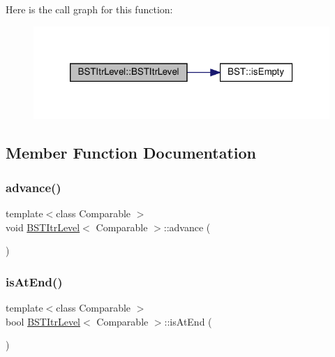 Here is the call graph for this function\+:\nopagebreak
\begin{figure}[H]
\begin{center}
\leavevmode
\includegraphics[width=320pt]{classBSTItrLevel_a8fd5cdde93eb182c4cd5cf6b2c5efaeb_cgraph}
\end{center}
\end{figure}


\subsection{Member Function Documentation}
\mbox{\label{classBSTItrLevel_ad54a6fa289a59d6050b507abe40d463b}} 
\subsubsection{\texorpdfstring{advance()}{advance()}}
{\footnotesize\ttfamily template$<$class Comparable $>$ \\
void \hyperlink{classBSTItrLevel}{B\+S\+T\+Itr\+Level}$<$ Comparable $>$\+::advance (\begin{DoxyParamCaption}{ }\end{DoxyParamCaption})}

\mbox{\label{classBSTItrLevel_a89bc8e81dde255fd6bad917cacc0d489}} 
\subsubsection{\texorpdfstring{is\+At\+End()}{isAtEnd()}}
{\footnotesize\ttfamily template$<$class Comparable $>$ \\
bool \hyperlink{classBSTItrLevel}{B\+S\+T\+Itr\+Level}$<$ Comparable $>$\+::is\+At\+End (\begin{DoxyParamCaption}{ }\end{DoxyParamCaption})\hspace{0.3cm}{\ttfamily [inline]}}

